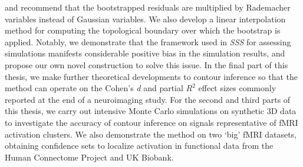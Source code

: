 \documentclass[11pt,a4paper]{report}
\begin{document}
\begin{singlespace}
\begin{thesisabstract}
\begin{singlespace}
and recommend that the bootstrapped residuals are multiplied by Rademacher variables instead of Gaussian variables. We also develop a linear interpolation method for computing the topological boundary over which the bootstrap is applied. Notably, we demonstrate that the framework used in \textit{SSS} for assessing simulations manifests considerable positive bias in the simulation results, and propose our own novel construction to solve this issue. In the final part of this thesis, we make further theoretical developments to contour inference so that the method can operate on the Cohen's \textit{d} and partial $R^{2}$ effect sizes commonly reported at the end of a neuroimaging study. For the second and third parts of this thesis, we carry out intensive Monte Carlo simulations on synthetic 3D data to investigate the accuracy of contour inference on signals representative of fMRI activation clusters. We also demonstrate the method on two `big' fMRI datasets, obtaining confidence sets to localize activation in functional data from the Human Connectome Project and UK Biobank.	

\end{singlespace}
\end{thesisabstract}
\end{singlespace}



\begin{thesisacknowledgments}        %

\end{thesisacknowledgments}
\end{document}
